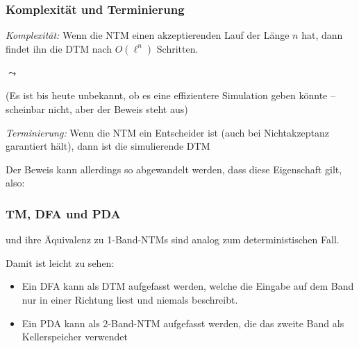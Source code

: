 \documentclass[aspectratio=1610,onlymath]{beamer}
\begin{document}
\begin{frame}[t]\frametitle{Komplexität und Terminierung}


\emph{Komplexität:}
Wenn die NTM einen akzeptierenden Lauf der Länge $n$ hat, dann findet ihn die DTM nach
$O(\ell^n)$ Schritten.
\medskip

$\leadsto$ 

(Es ist bis heute unbekannt, ob es eine effizientere Simulation geben könnte -- scheinbar nicht, aber der Beweis steht aus)\pause\bigskip

\emph{Terminierung:}
Wenn die NTM ein Entscheider ist (auch bei Nichtakzeptanz garantiert hält), dann ist die
simulierende DTM \ghost{\ldots}\\\pause {}
\medskip

Der Beweis kann allerdings so abgewandelt werden, dass diese Eigenschaft gilt, also:


\end{frame}

\begin{frame}\frametitle{TM, DFA und PDA}

 und ihre Äquivalenz zu 1-Band-NTMs sind analog zum deterministischen Fall.
\medskip

Damit ist leicht zu sehen:
\begin{itemize}
\item Ein DFA kann als DTM aufgefasst werden, welche die Eingabe auf dem Band nur in einer Richtung
liest und niemals beschreibt.
\item Ein PDA kann als 2-Band-NTM aufgefasst werden, die das zweite Band als Kellerspeicher verwendet
\end{itemize}

\end{frame}


% 
\end{document}
